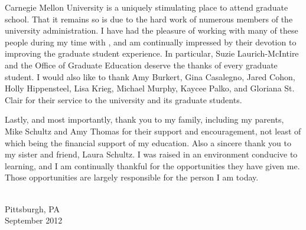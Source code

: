 Carnegie Mellon University is a uniquely stimulating place to attend graduate school. That
it remains so is due to the hard work of numerous members of the university
administration. I have had the pleasure of working with many of these people during my
time with , and am continually impressed by their devotion to improving the
graduate student experience. In particular, Suzie Laurich-McIntire and the Office of
Graduate Education deserve the thanks of every graduate student. I would also like to
thank Amy Burkert, Gina Casalegno, Jared Cohon, Holly Hippensteel, Lisa Krieg, Michael
Murphy, Kaycee Palko, and Gloriana St. Clair for their service to the university and its
graduate students.

Lastly, and most importantly, thank you to my family, including my parents, Mike Schultz
and Amy Thomas for their support and encouragement, not least of which being the financial
support of my education. Also a sincere thank you to my sister and friend, Laura Schultz.
I was raised in an environment conducive to learning, and I am continually thankful for
the opportunities they have given me. Those opportunities are largely responsible for the
person I am today.


{ \\ Pittsburgh, PA \\ September 2012\par}
